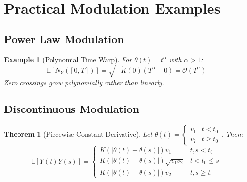 \documentclass{article}
\newtheorem{theorem}{Theorem}
\newtheorem{example}{Example}
\begin{document}
\section{Practical Modulation Examples}

\subsection{Power Law Modulation}

\begin{example}[Polynomial Time Warp]
For $\theta(t) = t^\alpha$ with $\alpha > 1$:
\begin{equation*}
\mathbb{E}[N_Y([0,T])] = \sqrt{-\ddot{K}(0)}(T^\alpha - 0) = \mathcal{O}(T^\alpha)
\end{equation*}
Zero crossings grow polynomially rather than linearly.
\end{example}

\subsection{Discontinuous Modulation}

\begin{theorem}[Piecewise Constant Derivative]
Let $\dot{\theta}(t) = \begin{cases} v_1 & t < t_0 \\ v_2 & t \geq t_0 \end{cases}$. Then:
\begin{equation*}
\mathbb{E}[Y(t)Y(s)] = \begin{cases} 
K(|\theta(t)-\theta(s)|)v_1 & t,s < t_0 \\
K(|\theta(t)-\theta(s)|)\sqrt{v_1v_2} & t < t_0 \leq s \\
K(|\theta(t)-\theta(s)|)v_2 & t,s \geq t_0
\end{cases}
\end{equation*}
\end{theorem}
\end{document}
